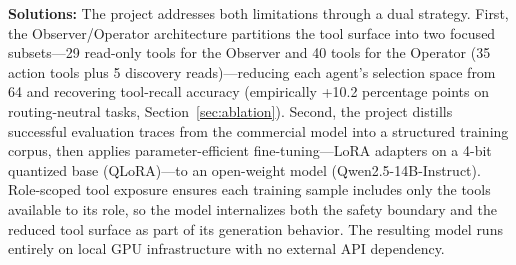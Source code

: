 \textbf{Solutions:} The project addresses both limitations through a dual strategy. First, the Observer/Operator architecture partitions the tool surface into two focused subsets---29 read-only tools for the Observer and 40 tools for the Operator (35 action tools plus 5 discovery reads)---reducing each agent's selection space from 64 and recovering tool-recall accuracy (empirically +10.2 percentage points on routing-neutral tasks, Section~\ref{sec:ablation}). Second, the project distills successful evaluation traces from the commercial model into a structured training corpus, then applies parameter-efficient fine-tuning---LoRA adapters on a 4-bit quantized base (QLoRA)---to an open-weight model (Qwen2.5-14B-Instruct). Role-scoped tool exposure ensures each training sample includes only the tools available to its role, so the model internalizes both the safety boundary and the reduced tool surface as part of its generation behavior. The resulting model runs entirely on local GPU infrastructure with no external API dependency.
